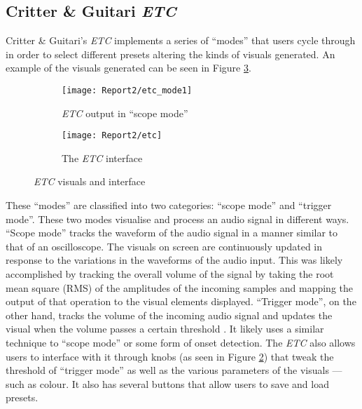 \documentclass[../../main_report2.tex]{subfiles}
\begin{document}
\subsection{Critter \& Guitari \textit{ETC}}
Critter \& Guitari's \textit{ETC} implements a series of ``modes'' that users cycle through in order to select different presets altering the kinds of visuals generated. An example of the visuals generated can be seen in Figure \ref{fig:etc1}.

\begin{figure}[h]
  \begin{subfigure}{0.5\textwidth}
  \texttt{[image: Report2/etc\_mode1]}
  \caption{\textit{ETC} output in ``scope mode''}
  \label{fig:etc_mode1}
\end{subfigure}
\begin{subfigure}{0.5\textwidth}
  \texttt{[image: Report2/etc]}
  \caption{The \textit{ETC} interface}
  \label{fig:etc_interface}
\end{subfigure}
\caption{\textit{ETC} visuals and interface}
\label{fig:etc1}
\end{figure}

These ``modes'' are classified into two categories: ``scope mode'' and ``trigger mode''. These two modes visualise and process an audio signal in different ways. ``Scope mode'' tracks the waveform of the audio signal in a manner similar to that of an oscilloscope. The visuals on screen are continuously updated in response to the variations in the waveforms of the audio input. This was likely accomplished by tracking the overall volume of the signal by taking the root mean square (RMS) of the amplitudes of the incoming samples and mapping the output of that operation to the visual elements displayed. ``Trigger mode'', on the other hand, tracks the volume of the incoming audio signal and updates the visual when the volume passes a certain threshold \cite{ETCmanual}. It likely uses a similar technique to ``scope mode'' or some form of onset detection. The \textit{ETC} also allows users to interface with it through knobs (as seen in Figure \ref{fig:etc_interface}) that tweak the threshold of ``trigger mode'' as well as the various parameters of the visuals --- such as colour. It also has several buttons that allow users to save and load presets. \par
\end{document}
